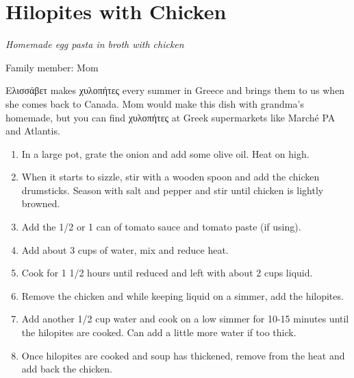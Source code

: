 \chapter{Hilopites with Chicken}
\label{ch:hilopites}
\textit{Homemade egg pasta in broth with chicken}

Family member: Mom



 \textgreek{Ελισσάβετ} makes \textgreek{χυλοπήτες} every summer in Greece and brings them to us when she comes back to Canada. Mom would make this dish with grandma's homemade, but you can find \textgreek{χυλοπήτες} at Greek supermarkets like Marché PA and Atlantis.

\begin{enumerate}
    \item In a large pot, grate the onion and add some olive oil. Heat on high.
    \item When it starts to sizzle, stir with a wooden spoon and add the chicken drumsticks. Season with salt and pepper and stir until chicken is lightly browned.
    \item Add the 1/2 or 1 can of tomato sauce and tomato paste (if using).
    \item Add about 3 cups of water, mix and reduce heat.
    \item Cook for 1 1/2 hours until reduced and left with about 2 cups liquid.
    \item Remove the chicken and while keeping liquid on a simmer, add the hilopites.
    \item Add another 1/2 cup water and cook on a low simmer for 10-15 minutes until the hilopites are cooked. Can add a little more water if too thick.
    \item Once hilopites are cooked and soup has thickened, remove from the heat and add back the chicken.
\end{enumerate}

